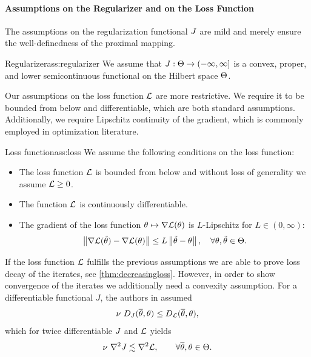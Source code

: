 \paragraph{Assumptions on the Regularizer and on the Loss Function}
%
The assumptions on the regularization functional $J$ are mild and merely ensure the well-definedness of the proximal mapping.
%
%
\begin{assumption}{Regularizer}{ass:regularizer}
We assume that $J:\Theta\to(-\infty,\infty]$ is a convex, proper, and lower semicontinuous functional on the Hilbert space $\Theta$.
\end{assumption}
%
%
\noindent%
Our assumptions on the loss function $\mathcal{L}$ are more restrictive. We require it to be bounded from below and differentiable, which are both standard assumptions. Additionally, we require Lipschitz continuity of the gradient, which is commonly employed in optimization literature.
%
\begin{assumption}{Loss function}{ass:loss}
We assume the following conditions on the loss function:
\begin{itemize}
    \item The loss function $\mathcal{L}$ is bounded from below and without loss of generality we assume $\mathcal{L}\geq 0$.
    \item The function $\mathcal{L}$ is continuously differentiable.
    \item The gradient of the loss function $\theta\mapsto\nabla\mathcal{L}(\theta)$ is $L$-Lipschitz for $L\in(0,\infty)$:
    \begin{align}\label{ineq:gradLip}
        \left\|\nabla\mathcal{L}(\tilde{\theta})-\nabla\mathcal{L}(\theta)\right\|\leq L \left\|\tilde{\theta}-\theta\right\|,\quad \forall \theta,\tilde{\theta}\in\Theta.
    \end{align}
\end{itemize}
\end{assumption}
%
%
\noindent%
If the loss function $\mathcal{L}$ fulfills the previous assumptions we are able to prove loss decay of the iterates, see \cref{thm:decreasingloss}. However, in order to show convergence of the iterates we additionally need a convexity assumption. For a differentiable functional $J$, the authors in \cite{dragomir2021fast} assumed
%
\begin{align*}
\nu\ D_J(\overline\theta,\theta) \leq D_{\mathcal{L}}(\overline\theta,\theta),
\end{align*}
%
which for twice differentiable $J$ and $\mathcal{L}$ yields
%
\begin{align*}
\nu\ \nabla^2 J \lesssim \nabla^2 \mathcal{L},\qquad\forall\overline\theta,\theta\in\Theta.
\end{align*}
